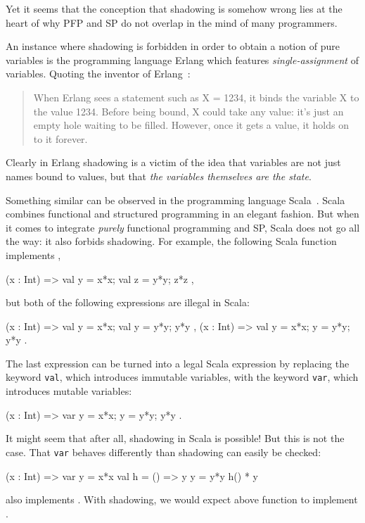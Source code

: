 \documentclass{llncs}
\newcommand{\bsrc}[1] {\lstinline!#1!}
\begin{document}
Yet it seems that the conception that shadowing is somehow wrong lies at the heart of why PFP and SP do not overlap in the mind of many programmers. 

An instance where shadowing is forbidden in order to obtain a notion of pure variables is the programming language Erlang which features \emph{single-assignment} of variables. Quoting the inventor of Erlang~\cite[p. 29]{erlang}: 
\begin{quote}
When Erlang sees a statement such as X = 1234, it binds the variable X to the value 1234. Before being bound, X could take any value: it's just an empty hole waiting to be filled. However, once it gets a value, it holds on to it forever.
\end{quote}
Clearly in Erlang shadowing is a victim of the idea that variables are not just names bound to values, but that \emph{the variables themselves are the state}.

Something similar can be observed in the programming language Scala~\cite{scala}. Scala combines functional and structured programming in an elegant fashion. But when it comes to integrate \emph{purely} functional programming and SP, Scala does not go all the way: it also forbids shadowing. For example, the following Scala function implements ,
\begin{babellisting}
(x : Int) => { val y = x*x; val z = y*y; z*z },
\end{babellisting}
but both of the following expressions are illegal in Scala:
\begin{babellisting}
(x : Int) => { val y = x*x; val y = y*y; y*y },
(x : Int) => { val y = x*x; y = y*y; y*y }.
\end{babellisting}
The last expression can be turned into a legal Scala expression by replacing the keyword \bsrc{val}, which introduces immutable variables, with the keyword \bsrc{var}, which introduces mutable variables:
\begin{babellisting}
(x : Int) => { var y = x*x; y = y*y; y*y }.
\end{babellisting}
It might seem that after all, shadowing in Scala is possible! But this is not the case. That \bsrc{var}
behaves differently than shadowing can easily be checked:
\begin{babellisting}
(x : Int) => {  var y = x*x
                val h = () => y
                y = y*y
                h() * y  }
\end{babellisting}
also implements . With shadowing, we would expect above function to implement .
\end{document}
